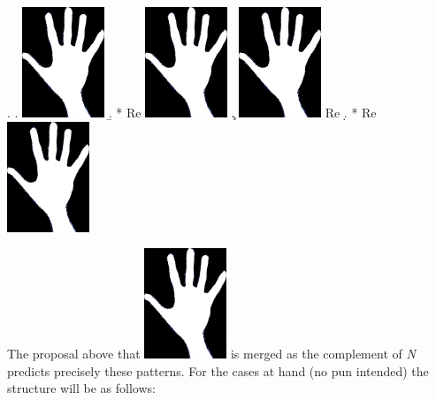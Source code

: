 \documentclass[output=paper]{LSP/langsci}
\begin{document}
\Lsciex.
\a. \na \includegraphics[scale=0.7]{figures/mou4.jpg}
\b. * Re  \includegraphics[scale=0.7]{figures/mou4.jpg}
\c. \na \includegraphics[scale=0.7]{figures/mou4.jpg} Re
\d. * \na Re  \includegraphics[scale=0.7]{figures/mou4.jpg}

The proposal above that \includegraphics[scale=0.7]{figures/mou4.jpg} is merged as the complement of \textit{N} predicts precisely these patterns. For the cases at hand (no pun intended) the structure will be as follows:\largerpage[2]
\end{document}
